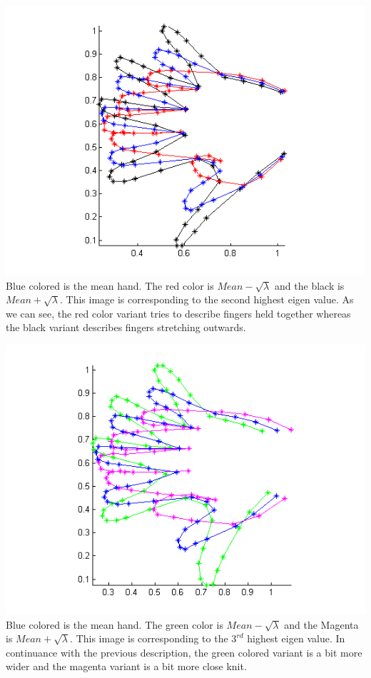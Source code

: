 \documentclass[paper=a4, fontsize=11pt,twoside]{scrartcl}	%
\begin{document}
\includegraphics{HandMode2.png}
Blue colored is the mean hand. The red color is $Mean - \sqrt{\lambda}$ and the black is $Mean + \sqrt{\lambda}$. This image is corresponding to the second highest eigen value. As we can see, the red color variant tries to describe fingers held together whereas the black variant describes fingers stretching outwards.

\includegraphics{HandMode3.png}
Blue colored is the mean hand. The green color is $Mean - \sqrt{\lambda}$ and the Magenta is $Mean + \sqrt{\lambda}$. This image is corresponding to the $3^{rd}$ highest eigen value. In continuance with the previous description, the green colored variant is a bit more wider and the magenta variant is a bit more close knit.
\end{document}
